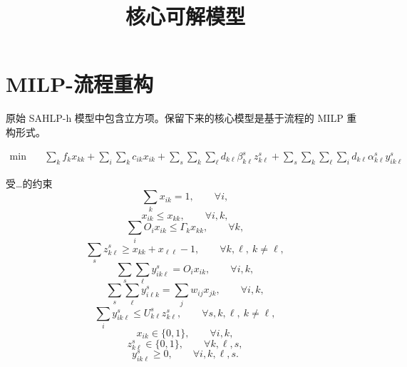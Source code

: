 \documentclass[11pt,a4paper]{article}
\title{核心可解模型}
\author{}
\date{}
\begin{document}
\maketitle

\section*{MILP-流程重构}
原始 SAHLP-h 模型中包含立方项。保留下来的核心模型是基于流程的 MILP 重构形式。

\begin{equation}
\begin{aligned}
\min \quad
& \sum_k f_k x_{kk}
+ \sum_i \sum_k c_{ik} x_{ik}
+ \sum_s \sum_k \sum_\ell d_{k\ell} \beta_{k\ell}^s z_{k\ell}^s
+ \sum_s \sum_k \sum_\ell \sum_i d_{k\ell} \alpha_{k\ell}^s y_{ik\ell}^s
\end{aligned}
\tag{M1}
\end{equation}

受…的约束
\begin{equation}
\sum_k x_{ik} = 1,
\qquad \forall i,
\tag{M2}
\end{equation}
\begin{equation}
x_{ik} \le x_{kk},
\qquad \forall i,k,
\tag{M3}
\end{equation}
\begin{equation}
\sum_i O_i x_{ik} \le \Gamma_k x_{kk},
\qquad \forall k,
\tag{M4}
\end{equation}
\begin{equation}
\sum_s z_{k\ell}^s \ge x_{kk} + x_{\ell\ell} - 1,
\qquad \forall k,\ell,\ k \neq \ell,
\tag{M5}
\end{equation}
\begin{equation}
\sum_s \sum_\ell y_{ik\ell}^s = O_i x_{ik},
\qquad \forall i,k,
\tag{M6}
\end{equation}
\begin{equation}
\sum_s \sum_\ell y_{i\ell k}^s = \sum_j w_{ij} x_{jk},
\qquad \forall i,k,
\tag{M7}
\end{equation}
\begin{equation}
\sum_i y_{ik\ell}^s \le U_{k\ell}^s z_{k\ell}^s,
\qquad \forall s,k,\ell,\ k \neq \ell,
\tag{M8}
\end{equation}
\begin{equation}
x_{ik} \in \{0,1\},
\qquad \forall i,k,
\tag{M9}
\end{equation}
\begin{equation}
z_{k\ell}^s \in \{0,1\},
\qquad \forall k,\ell,s,
\tag{M10}
\end{equation}
\begin{equation}
y_{ik\ell}^s \ge 0,
\qquad \forall i,k,\ell,s.
\tag{M11}
\end{equation}
\end{document}

